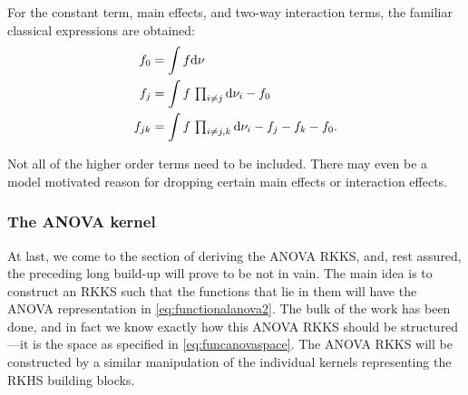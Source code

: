 
For the constant term, main effects, and two-way interaction terms, the familiar classical expressions are obtained:
\begin{align*}
  f_0 &= \int f \text{d}\nu \\
  f_j &= \int f \, \textstyle\prod_{i\neq j} \text{d}\nu_i  - f_0 \\
  f_{jk} &= \int f \, \textstyle\prod_{i\neq j,k} \text{d}\nu_i  - f_j - f_k - f_0  .
\end{align*}



\begin{remark}
  Not all of the higher order terms need to be included. There may even be a model motivated reason for dropping certain main effects or interaction effects.  
\end{remark}


\subsubsection{The ANOVA kernel}

At last, we come to the section of deriving the ANOVA RKKS, and, rest assured, the preceding long build-up will prove to be not in vain.
The main idea is to construct an RKKS such that the functions that lie in them will have the ANOVA representation in \cref{eq:functionalanova2}.
The bulk of the work has been done, and in fact we know exactly how this ANOVA RKKS should be structured---it is the space as specified in \cref{eq:funcanovaspace}. 
The ANOVA RKKS will be constructed by a similar manipulation of the individual kernels representing the RKHS building blocks.

